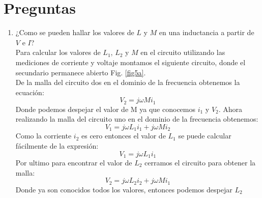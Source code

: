 \documentclass[twocolumn]{IEEEtran}
\begin{document}
\section{Preguntas}
\begin{enumerate}
 \item ¿Como se pueden hallar los valores de $L$ y $M$ en una inductancia a partir de $V$ e $I$?\\
Para calcular los valores de $L_1$, $L_2$ y $M$ en el circuito utilizando las mediciones de corriente y voltaje montamos el siguiente circuito, donde el secundario permanece abierto Fig. \ref{fig5a}.\\
De la malla del circuito dos en el dominio de la frecuencia obtenemos la ecuación:
\begin{equation}
 V_2 = j \omega Mi_1
\label{equ1}
\end{equation}
\noindent
Donde podemos despejar el valor de M ya que conocemos $i_1$ y $V_2$.
Ahora realizando la malla del circuito uno en el dominio de la frecuencia obtenemos:
\begin{equation}
 {V_1} = j\omega {L_1}{i_1} + j\omega M{i_2}
\label{equ2}
\end{equation}
\noindent
Como la corriente $i_2$ es cero entonces el valor de $L_1$ se puede calcular fácilmente de la expresión:
\begin{equation}
 {V_1} = j\omega {L_1}{i_1}
\label{equ3}
\end{equation}
\noindent
Por ultimo para encontrar el valor de $L_2$ cerramos el circuito para obtener la malla:
\begin{equation}
 {V_2} = j\omega {L_2}{i_2} + j\omega M{i_1}
\label{equ4}
\end{equation}
\noindent
Donde ya son conocidos todos los valores, entonces podemos despejar $L_2$


\end{enumerate}
\end{document}
